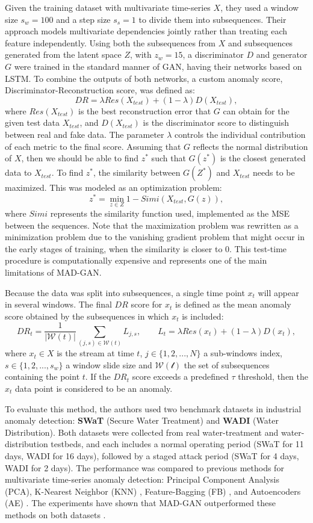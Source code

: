 Given the training dataset with multivariate time-series $X$, they used a window size $s_w = 100$ and a step size $s_s = 1$ to divide them into subsequences. Their approach models multivariate dependencies jointly rather than treating each feature independently. Using both the subsequences from $X$ and subsequences generated from the latent space $Z$, with $z_w = 15$, a discriminator $D$ and generator $G$ were trained in the standard manner of GAN, having their networks based on LSTM. To combine the outputs of both networks, a custom anomaly score, Discriminator-Reconstruction score, was defined as:
$$
DR = \lambda Res(X_{test}) + (1-\lambda) D(X_{test}),
$$
where $Res(X_{test})$ is the best reconstruction error that $G$ can obtain for the given test data $X_{test}$, and $D(X_{test})$ is the discriminator score to distinguish between real and fake data. The parameter $\lambda$ controls the individual contribution of each metric to the final score. Assuming that $G$ reflects the normal distribution of $X$, then we should be able to find $z^*$ such that $G(z^*)$ is the closest generated data to $X_{test}$. To find $z^*$, the similarity between $G(Z^*)$ and $X_{test}$ needs to be maximized. This was modeled as an optimization problem:
$$
z^* = \min_{z \in Z} 1 - Simi(X_{test}, G(z)),
$$
where $Simi$ represents the similarity function used, implemented as the MSE between the sequences. Note that the maximization problem was rewritten as a minimization problem due to the vanishing gradient problem that might occur in the early stages of training, when the similarity is closer to 0. This test-time procedure is computationally expensive and represents one of the main limitations of MAD-GAN.

Because the data was split into subsequences, a single time point $x_t$ will appear in several windows. The final $DR$ score for $x_t$ is defined as the mean anomaly score obtained by the subsequences in which $x_t$ is included:
$$
DR_t = \frac{1}{|\mathcal{W}(t)|} \sum_{(j,s) \in \mathcal{W}(t)} L_{j,s},
\qquad
L_{t} = \lambda Res(x_{t}) + (1-\lambda) D(x_{t}),
$$
where $x_t \in X$ is the stream at time $t$, $j \in \{ 1, 2, ..., N\}$ a sub-windows index, $s \in \{ 1, 2, ..., s_w\}$ a window slide size and $\mathcal{W(t)}$ the set of subsequences containing the point $t$. If the $DR_t$ score exceeds a predefined $\tau$ threshold, then the $x_t$ data point is considered to be an anomaly.

To evaluate this method, the authors used two benchmark datasets in industrial anomaly detection: \textbf{SWaT} (Secure Water Treatment) and \textbf{WADI} (Water Distribution). Both datasets were collected from real water-treatment and water-distribution testbeds, and each includes a normal operating period (SWaT for 11 days, WADI for 16 days), followed by a staged attack period (SWaT for 4 days, WADI for 2 days). The performance was compared to previous methods for multivariate time-series anomaly detection: Principal Component Analysis (PCA), K-Nearest Neighbor (KNN) \cite{angiulli2002knn-ad}, Feature-Bagging (FB) \cite{lazarevic2005fb-ad}, and Autoencoders (AE) \cite{an2015vae-ae-ad}. The experiments have shown that MAD-GAN outperformed these methods on both datasets \cite{li2019madgan}.

